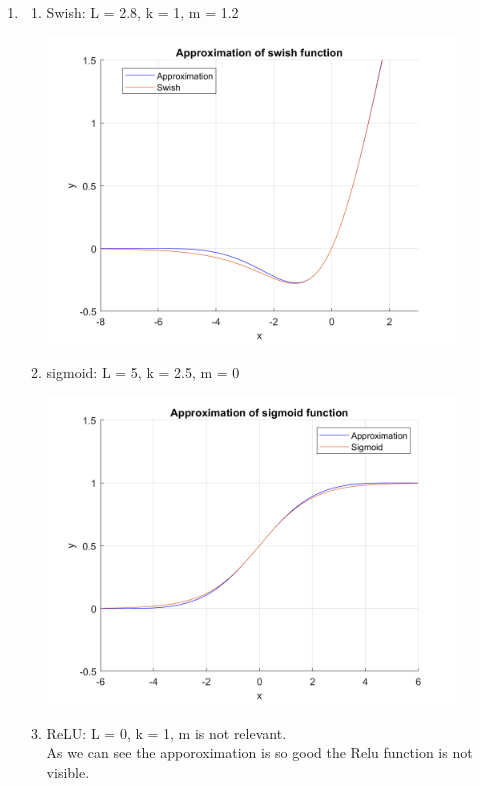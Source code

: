 \documentclass{article}
\begin{document}
\begin{enumerate}[label=\Alph*]
  \item 
  \begin{enumerate}
  \item Swish: L = 2.8, k = 1, m = 1.2
  \begin{center} \includegraphics[width=0.9\textwidth]{Problem7_swish.png} \end{center}
  \item sigmoid: L = 5, k = 2.5, m = 0
  \begin{center} \includegraphics[width=0.9\textwidth]{Problem7_sigmoid.png} \end{center}
  \item ReLU: L = 0, k = 1, m is not relevant. \\ As we can see the apporoximation is so good the Relu function is not visible.

\end{enumerate}
\end{enumerate}
\end{document}

